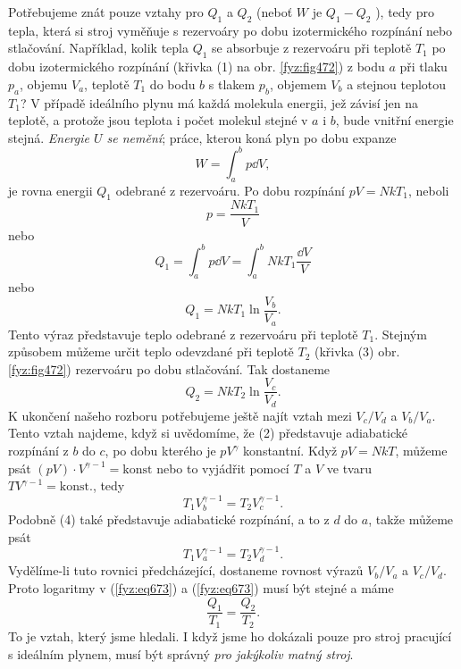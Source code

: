     Potřebujeme znát pouze vztahy pro \(Q_1\) a \(Q_2\) (neboť \(W\) je \(Q_1 - Q_2\) ), tedy pro
    tepla, která si stroj vyměňuje s rezervoáry po dobu izotermického rozpínání nebo stlačování.
    Například, kolik tepla \(Q_1\) se absorbuje z rezervoáru při teplotě \(T_1\) po dobu
    izotermického rozpínání (křivka (1) na obr. \ref{fyz:fig472}) z bodu \(a\) při tlaku \(p_a\),
    objemu \(V_a\), teplotě \(T_1\) do bodu \(b\) s tlakem \(p_b\), objemem \(V_b\) a stejnou
    teplotou \(T_1\)? V případě ideálního plynu má každá molekula energii, jež závisí jen na
    teplotě, a protože jsou teplota i počet molekul stejné v \(a\) i \(b\), bude vnitřní energie
    stejná. \emph{Energie \(U\) se nemění}; práce, kterou koná plyn po dobu expanze 
    \begin{equation*}
      W=∫^b_ap\dd{V},
    \end{equation*}
    je rovna energii \(Q_1\) odebrané z rezervoáru. Po dobu rozpínání \(pV= NkT_1\), neboli
    \begin{equation}\label{fyz:eq671}
      p=\frac{NkT_1}{V}
    \end{equation}
    nebo
    \begin{equation}\label{fyz:eq672}
      Q_1=∫^b_ap\dd{V}=∫^b_aNkT_1\frac{\dd{V}}{V}
    \end{equation}
    nebo
    \begin{equation}\label{fyz:eq673}
      Q_1=NkT_1\ln\frac{V_b}{V_a}.
    \end{equation}
    Tento výraz představuje teplo odebrané z rezervoáru při teplotě \(T_1\). Stejným způsobem můžeme
    určit teplo odevzdané při teplotě \(T_2\) (křivka (3) obr. \ref{fyz:fig472}) rezervoáru po dobu
    stlačování. Tak dostaneme
    \begin{equation}\label{fyz:eq674}
      Q_2=NkT_2\ln\frac{V_c}{V_d}.
    \end{equation}
    K ukončení našeho rozboru potřebujeme ještě najít vztah mezi \(V_c/V_d\) a \(V_b/V_a\). Tento
    vztah najdeme, když si uvědomíme, že (2) představuje adiabatické rozpínání z \(b\) do \(c\), po
    dobu kterého je \(pV^\gamma\) konstantní. Když \(pV= NkT\), můžeme psát \((pV)\cdot V^{\gamma
    -1} = \text{konst}\) nebo to vyjádřit pomocí \(T\) a \(V\) ve tvaru \(TV^{\gamma - 1} =
    \text{konst.}\), tedy
    \begin{equation}\label{fyz:eq675}
      T_1V^{γ−1}_b=T_2V^{γ−1}_c.
    \end{equation}
    Podobně (4) také představuje adiabatické rozpínání, a to z \(d\) do \(a\), takže můžeme psát
    \begin{equation}\label{fyz:eq676}
      T_1V^{γ−1}_a=T_2V^{γ−1}_d.
    \end{equation}
    Vydělíme-li tuto rovnici předcházející, dostaneme rovnost výrazů \(V_b/V_a\) a \(V_c/V_d\).
    Proto logaritmy v (\ref{fyz:eq673}) a (\ref{fyz:eq673}) musí být stejné a máme
    \begin{equation}\label{fyz:eq677}
      \frac{Q_1}{T_1}=\frac{Q_2}{T_2}.
    \end{equation}
    To je vztah, který jsme hledali. I když jsme ho dokázali pouze pro stroj pracující s ideálním
    plynem, musí být správný \emph{pro jakýkoliv matný stroj}.

